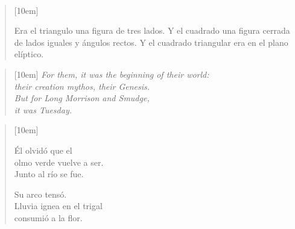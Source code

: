 \\[0.1cm]

\begin{verse}[10em]
\begin{altverse}
Era el triangulo una figura de tres lados.
Y el cuadrado una figura cerrada de lados
iguales y ángulos rectos.
Y el cuadrado triangular era en el plano elíptico.
\end{altverse}
\end{verse}

\begin{verse}[10em]
{\it For them, it was the beginning of their world:\\
their creation mythos, their Genesis.\\
But for Long Morrison and Smudge,\\
it was Tuesday.\\}
\end{verse}

\begin{verse}[10em]
\begin{altverse}
Él olvidó que el\\
olmo verde vuelve a ser.\\
Junto al río se fue.\\
\end{altverse}
\begin{altverse}
Su arco tensó.\\
Lluvia ignea en el trigal\\
consumió a la flor.\\
\end{altverse}
\end{verse}
